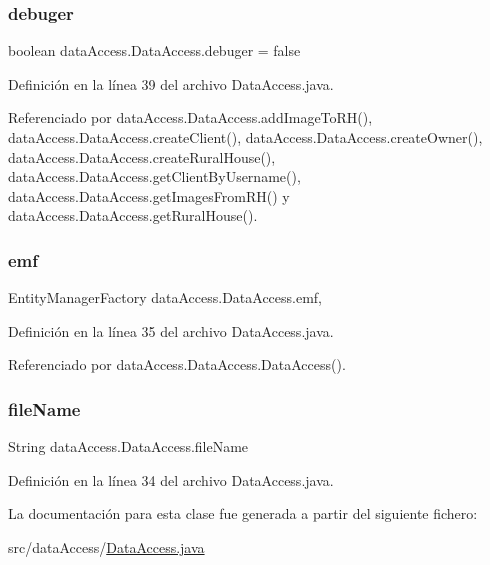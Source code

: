 \mbox{\label{classdata_access_1_1_data_access_a3a2da087d6452771264c177c02ecab4a}} 
\subsubsection{\texorpdfstring{debuger}{debuger}}
{\footnotesize\ttfamily boolean data\+Access.\+Data\+Access.\+debuger = false}



Definición en la línea 39 del archivo Data\+Access.\+java.



Referenciado por data\+Access.\+Data\+Access.\+add\+Image\+To\+R\+H(), data\+Access.\+Data\+Access.\+create\+Client(), data\+Access.\+Data\+Access.\+create\+Owner(), data\+Access.\+Data\+Access.\+create\+Rural\+House(), data\+Access.\+Data\+Access.\+get\+Client\+By\+Username(), data\+Access.\+Data\+Access.\+get\+Images\+From\+R\+H() y data\+Access.\+Data\+Access.\+get\+Rural\+House().

\mbox{\label{classdata_access_1_1_data_access_a158d2718ef5a80f4f296b14937cc1775}} 
\subsubsection{\texorpdfstring{emf}{emf}}
{\footnotesize\ttfamily Entity\+Manager\+Factory data\+Access.\+Data\+Access.\+emf\hspace{0.3cm}{\ttfamily [static]}, {\ttfamily [protected]}}



Definición en la línea 35 del archivo Data\+Access.\+java.



Referenciado por data\+Access.\+Data\+Access.\+Data\+Access().

\mbox{\label{classdata_access_1_1_data_access_aba38e7b60b8d2dc1d112ac7b5e5e4693}} 
\subsubsection{\texorpdfstring{fileName}{fileName}}
{\footnotesize\ttfamily String data\+Access.\+Data\+Access.\+file\+Name\hspace{0.3cm}{\ttfamily [static]}}



Definición en la línea 34 del archivo Data\+Access.\+java.



La documentación para esta clase fue generada a partir del siguiente fichero\+:\begin{DoxyCompactItemize}
\item 
src/data\+Access/\mbox{\hyperlink{_data_access_8java}{Data\+Access.\+java}}\end{DoxyCompactItemize}
